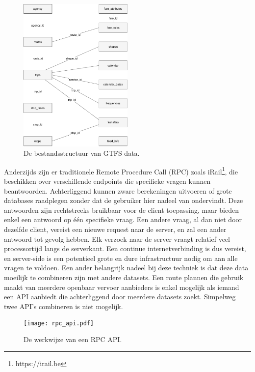 \begin{figure}
	\centering
	\includegraphics[width=0.5\textwidth]{images/GTFS_scheme.pdf}
		\caption[GTFS structuur]{De bestandsstructuur van GTFS data.}
	\label{fig:ldfAxis}
\end{figure}
 
Anderzijds zijn er traditionele Remote Procedure Call (RPC) zoals iRail\footnote{https://irail.be}, die beschikken over verschillende endpoints die specifieke vragen kunnen beantwoorden. Achterliggend kunnen zware berekeningen uitvoeren of grote databases raadplegen zonder dat de gebruiker hier nadeel van ondervindt. Deze antwoorden zijn rechtstreeks bruikbaar voor de client toepassing, maar bieden enkel een antwoord op één specifieke vraag. Een andere vraag, al dan niet door dezelfde client, vereist een nieuwe request naar de server, en zal een ander antwoord tot gevolg hebben. Elk verzoek naar de server vraagt relatief veel processortijd langs de serverkant. Een continue internetverbinding is dus vereist, en server-side is een potentieel grote en dure infrastructuur nodig om aan alle vragen te voldoen. Een ander belangrijk nadeel bij deze techniek is dat deze data moeilijk te combineren zijn met andere datasets. Een route plannen die gebruik maakt van meerdere openbaar vervoer aanbieders is enkel mogelijk als iemand een API aanbiedt die achterliggend door meerdere datasets zoekt. Simpelweg twee API's combineren is niet mogelijk.

\begin{figure}
	\centering
	\texttt{[image: rpc\_api.pdf]}
	\caption[RPC structuur]{De werkwijze van een RPC API.}
	\label{fig:ldfAxis}
\end{figure}

